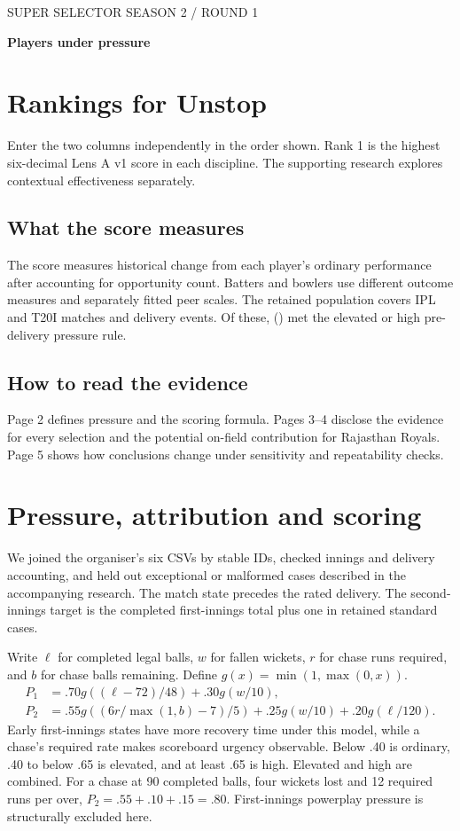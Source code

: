 \documentclass[11pt,a4paper]{article}
\begin{document}
{\small \textcolor{Rose}{SUPER SELECTOR SEASON 2 \quad / \quad ROUND 1}}

{\huge\bfseries Players under pressure}\\[6pt]
{\large \AuthorName}

\section*{Rankings for Unstop}
Enter the two columns independently in the order shown. Rank 1 is the highest six-decimal Lens A v1 score in each discipline. The supporting research explores contextual effectiveness separately.

\EntryTable

\subsection*{What the score measures}
The score measures historical change from each player's ordinary performance after accounting for opportunity count. Batters and bowlers use different outcome measures and separately fitted peer scales. The retained population covers \Matches{} IPL and T20I matches and \Deliveries{} delivery events. Of these, \Flagged{} (\FlaggedShare) met the elevated or high pre-delivery pressure rule.

\subsection*{How to read the evidence}
Page 2 defines pressure and the scoring formula. Pages 3--4 disclose the evidence for every selection and the potential on-field contribution for Rajasthan Royals. Page 5 shows how conclusions change under sensitivity and repeatability checks.

\clearpage
\section*{Pressure, attribution and scoring}
We joined the organiser's six CSVs by stable IDs, checked innings and delivery accounting, and held out exceptional or malformed cases described in the accompanying research. The match state precedes the rated delivery. The second-innings target is the completed first-innings total plus one in retained standard cases.

Write $\ell$ for completed legal balls, $w$ for fallen wickets, $r$ for chase runs required, and $b$ for chase balls remaining. Define $g(x)=\min(1,\max(0,x))$.
\begin{align*}
P_1 &= .70g((\ell-72)/48)+.30g(w/10),\\
P_2 &= .55g((6r/\max(1,b)-7)/5)+.25g(w/10)+.20g(\ell/120).
\end{align*}
Early first-innings states have more recovery time under this model, while a chase's required rate makes scoreboard urgency observable. Below .40 is ordinary, .40 to below .65 is elevated, and at least .65 is high. Elevated and high are combined. For a chase at 90 completed balls, four wickets lost and 12 required runs per over, $P_2=.55+.10+.15=.80$. First-innings powerplay pressure is structurally excluded here.
\end{document}
